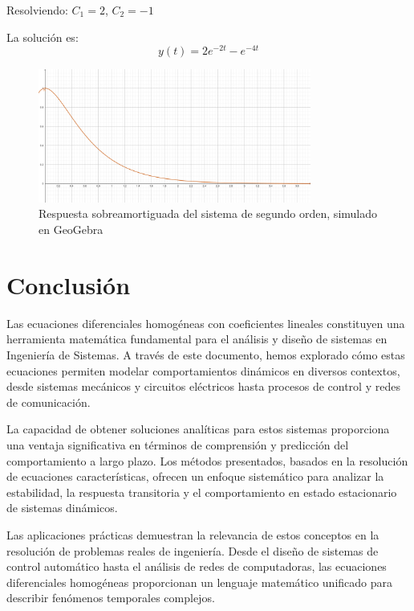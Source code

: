 \documentclass[12pt]{article}
\begin{document}
Resolviendo: $C_1 = 2$, $C_2 = -1$

La solución es:
\begin{equation}
    y(t) = 2e^{-2t} - e^{-4t}
\end{equation}

\begin{figure}[H]
    \centering
    \includegraphics[width=0.8\textwidth]{imagen-ejercicio5.png}
    \caption{Respuesta sobreamortiguada del sistema de segundo orden, simulado en GeoGebra}
\end{figure}

\section{Conclusión}

Las ecuaciones diferenciales homogéneas con coeficientes lineales constituyen una herramienta matemática fundamental para el análisis y diseño de sistemas en Ingeniería de Sistemas. A través de este documento, hemos explorado cómo estas ecuaciones permiten modelar comportamientos dinámicos en diversos contextos, desde sistemas mecánicos y circuitos eléctricos hasta procesos de control y redes de comunicación.

La capacidad de obtener soluciones analíticas para estos sistemas proporciona una ventaja significativa en términos de comprensión y predicción del comportamiento a largo plazo. Los métodos presentados, basados en la resolución de ecuaciones características, ofrecen un enfoque sistemático para analizar la estabilidad, la respuesta transitoria y el comportamiento en estado estacionario de sistemas dinámicos.

Las aplicaciones prácticas demuestran la relevancia de estos conceptos en la resolución de problemas reales de ingeniería. Desde el diseño de sistemas de control automático hasta el análisis de redes de computadoras, las ecuaciones diferenciales homogéneas proporcionan un lenguaje matemático unificado para describir fenómenos temporales complejos.
\end{document}
